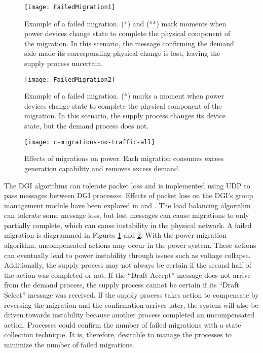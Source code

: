 \begin{figure}
\centering
\texttt{[image: FailedMigration1]}
\caption[Example of a failed migration.]{Example of a failed migration. (*) and (**) mark moments when power devices change state to complete the physical component of the migration. In this scenario, the message confirming the demand side made its corresponding physical change is lost, leaving the supply process uncertain.}
\label{fig:failed-migration-1}
\end{figure}

\begin{figure}
\centering
\texttt{[image: FailedMigration2]}
\caption[Example of a failed migration.]{Example of a failed migration. (*) marks a moment when power devices change state to complete the physical component of the migration. In this scenario, the supply process changes its device state, but the demand process does not.}
\label{fig:failed-migration-2}
\end{figure}

\begin{figure}
\centering
\texttt{[image: c-migrations-no-traffic-all]}
\caption[Effects of migrations on power.]{Effects of migrations on power. Each migration consumes excess generation capability and removes excess demand.}
\label{fig:good-migrations}
\end{figure}

The \ac{DGI} algorithms can tolerate packet loss and is implemented using UDP to pass messages between \ac{DGI} processes.
Effects of packet loss on the \ac{DGI}'s group management module have been explored in \cite{CRITIS2012} and \cite{JOURNAL}.
The load balancing algorithm can tolerate some message loss, but lost messages can cause migrations to only partially complete, which can cause instability in the physical network.
A failed migration is diagrammed in Figures \ref{fig:failed-migration-1} and \ref{fig:failed-migration-2}.
With the power migration algorithm, uncompensated actions may occur in the power system.
These actions can eventually lead to power instability through issues such as voltage collapse.
Additionally, the supply process may not always be certain if the second half of the action was completed or not.
If the ``Draft Accept'' message does not arrive from the demand process, the supply process cannot be certain if its ``Draft Select'' message was received.
If the supply process takes action to compensate by reversing the migration and the confirmation arrives later, the system will also be driven towards instability because another process completed an uncompensated action.
Processes could confirm the number of failed migrations with a state collection technique.
It is, therefore, desirable to manage the processes to minimize the number of failed migrations.


